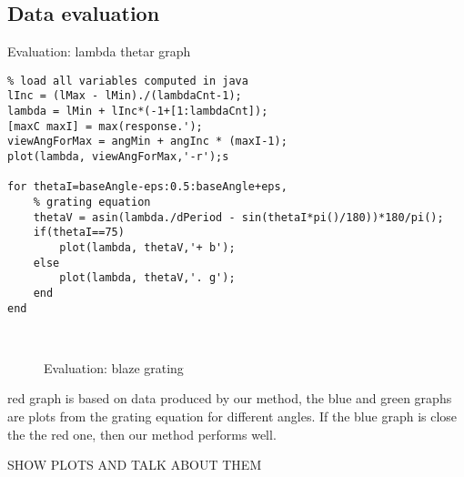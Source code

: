 \subsection{Data evaluation}

\begin{algorithm}
\caption{Evaluation: lambda thetar graph}
\label{alg:evalmatlab}
\begin{lstlisting}
% load all variables computed in java
lInc = (lMax - lMin)./(lambdaCnt-1);
lambda = lMin + lInc*(-1+[1:lambdaCnt]);
[maxC maxI] = max(response.');
viewAngForMax = angMin + angInc * (maxI-1);
plot(lambda, viewAngForMax,'-r');s

for thetaI=baseAngle-eps:0.5:baseAngle+eps,
	% grating equation
	thetaV = asin(lambda./dPeriod - sin(thetaI*pi()/180))*180/pi();
	if(thetaI==75)
		plot(lambda, thetaV,'+ b');
	else
		plot(lambda, thetaV,'. g');
	end
end

\end{lstlisting}
\end{algorithm}

\begin{figure}[ht]
  \centering
~
~
  \label{evaluationBlaze1}
  \caption{Evaluation: blaze grating}
\end{figure}

red graph is based on data produced by our method, the blue and green graphs are plots from the grating equation for different angles. If the blue graph is close the the red one, then our method performs well. 

SHOW PLOTS AND TALK ABOUT THEM
